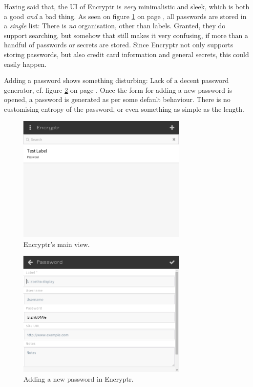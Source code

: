			Having said that, the UI of Encryptr is \emph{very} minimalistic and sleek, which is both a good \emph{and} a bad thing. As seen on figure \ref{fig:encryptr_main} on page \pageref{fig:encryptr_main}, all passwords are stored in a \emph{single} list: There is \emph{no} organisation, other than labels. Granted, they do support searching, but somehow that still makes it very confusing, if more than a handful of passwords or secrets are stored. Since Encryptr not only supports storing passwords, but also credit card information and general secrets, this could easily happen.

			Adding a password shows something disturbing: Lack of a decent password generator, cf. figure \ref{fig:encryptr_newpassword} on page \pageref{fig:encryptr_newpassword}. Once the form for adding a new password is opened, a password is generated as per some default behaviour. There is no customising entropy of the password, or even something as simple as the length.

			\begin{figure}[h!]
				\centering
				\includegraphics[width=0.75\textwidth]{figures/analysis/encryptr_main.png}
				\caption{Encryptr's main view.}
				\label{fig:encryptr_main}
			\end{figure}


			\begin{figure}[h!]
				\centering
				\includegraphics[width=0.75\textwidth]{figures/analysis/encryptr_newpassword_main.png}
				\caption{Adding a new password in Encryptr.}
				\label{fig:encryptr_newpassword}
			\end{figure}

